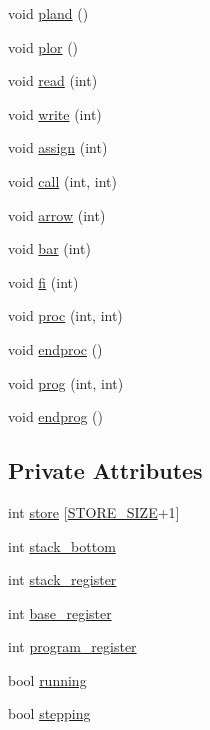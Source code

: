 \begin{DoxyCompactItemize}
\item 
void \hyperlink{classInterpreter_ac5a0b960cbc8c7ff686c127ccf806c09}{pland} ()
\item 
void \hyperlink{classInterpreter_a5f0454582ef1e52e2fcaee1b703553b8}{plor} ()
\item 
void \hyperlink{classInterpreter_a499070c59ca4127e57ad621bd489645c}{read} (int)
\item 
void \hyperlink{classInterpreter_a59c724a616fcd6c6ac176fe53ba6b81c}{write} (int)
\item 
void \hyperlink{classInterpreter_a19687bebaa308803b02e12239c0b812c}{assign} (int)
\item 
void \hyperlink{classInterpreter_ae8da184101a719f601e7d46c4920225f}{call} (int, int)
\item 
void \hyperlink{classInterpreter_a0301b087eed7addc3046b47c4438825d}{arrow} (int)
\item 
void \hyperlink{classInterpreter_aa29dee87877a4d5017642cfed6d14322}{bar} (int)
\item 
void \hyperlink{classInterpreter_a633b22152bac2b1e4c6156bea780f3ad}{fi} (int)
\item 
void \hyperlink{classInterpreter_a559d265d75195aab3e0390b62d35626f}{proc} (int, int)
\item 
void \hyperlink{classInterpreter_aea3951f5783795c265a9c032c67cd246}{endproc} ()
\item 
void \hyperlink{classInterpreter_a26e7331de08ed5f4aa54e2cc0db83798}{prog} (int, int)
\item 
void \hyperlink{classInterpreter_ad8087c5f94eafe127280d03351906424}{endprog} ()
\end{DoxyCompactItemize}
\subsection*{Private Attributes}
\begin{DoxyCompactItemize}
\item 
int \hyperlink{classInterpreter_af320a034984d7ea210a546c9d0313443}{store} \mbox{[}\hyperlink{interp_8h_a610b46241859b5e63fe92fae6d55d14e}{STORE\_\-SIZE}+1\mbox{]}
\item 
int \hyperlink{classInterpreter_ac2b2272e7e93df082733e94d0c2e39df}{stack\_\-bottom}
\item 
int \hyperlink{classInterpreter_adceea023d2b221e04ccc84ce0260301e}{stack\_\-register}
\item 
int \hyperlink{classInterpreter_a0805dbd4ca54babe4f4b60055f36aa27}{base\_\-register}
\item 
int \hyperlink{classInterpreter_a341a6e3cb3a9a23afef084eac5e1ff41}{program\_\-register}
\item 
bool \hyperlink{classInterpreter_a26d311ea5a776034720f8ce465f04bc2}{running}
\item 
bool \hyperlink{classInterpreter_a55aac45fbc90e77dac77042f269009ad}{stepping}
\end{DoxyCompactItemize}



